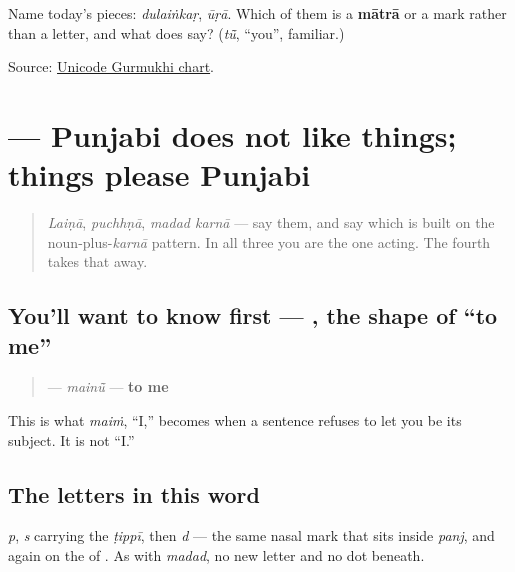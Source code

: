 \begin{tcolorbox}[breakable,colback=teal!4,colframe=teal!35!black,title={Before you move on}]
Name today's pieces: \emph{dulaiṅkaṛ}, \emph{ūṛā}. Which of them is a \textbf{mātrā} or a mark rather than a letter, and what does \textbf{} say? (\emph{tū̃}, “you”, familiar.)

Source: \href{https://www.unicode.org/charts/PDF/U0A00.pdf}{Unicode Gurmukhi chart}.
\end{tcolorbox}
\section[\texorpdfstring{\pa{ਪਸੰਦ} (pasand)}{ਪਸੰਦ (pasand)}]{ — Punjabi does not like things; things please Punjabi}

\label{lesson:PA-C09-pasand}



\begin{quote}
\emph{Laiṇā}, \emph{puchhṇā}, \emph{madad karnā} — say them, and say which is built on the noun-plus-\emph{karnā} pattern. In all three you are the one acting. The fourth takes that away.
\end{quote}

\subsection*{You'll want to know first — , the shape of “to me”}
\begin{quote}
\textbf{} — \emph{mainū̃} — \textbf{to me}
\end{quote}

This is what \textbf{} \emph{maiṁ}, “I,” becomes when a sentence refuses to let you be its subject. It is not “I.”

\subsection*{The letters in this word}
\textbf{} \emph{p}, \textbf{} \emph{s} carrying the \textbf{} \emph{ṭippī}, then \textbf{} \emph{d} — the same nasal mark that sits inside \textbf{} \emph{panj}, and again on the \textbf{} of \textbf{}. As with \emph{madad}, no new letter and no dot beneath.

